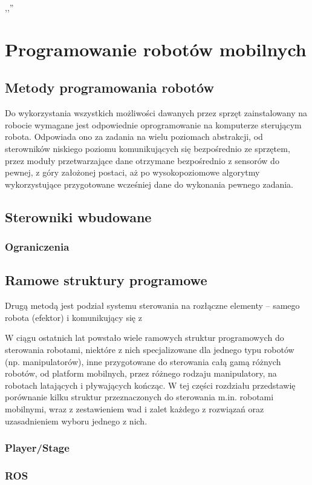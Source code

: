 

\begin{savequote}[70mm]
,,''
\qauthor{}
\end{savequote}


\chapter{Programowanie robotów mobilnych}
\label{chap:programowanie}

\section{Metody programowania robotów}

Do wykorzystania wszystkich możliwości dawanych przez sprzęt zainstalowany na robocie
wymagane jest odpowiednie oprogramowanie na komputerze sterującym robota. Odpowiada
ono za zadania na wielu poziomach abstrakcji, od sterowników niskiego poziomu
komunikujących się bezpośrednio ze sprzętem, przez moduły przetwarzające dane otrzymane
bezpośrednio z sensorów do pewnej, z góry założonej postaci, aż po wysokopoziomowe
algorytmy wykorzystujące przygotowane wcześniej dane do wykonania pewnego zadania.

\section{Sterowniki wbudowane}

\subsection{Ograniczenia}

\section{Ramowe struktury programowe}

Drugą metodą jest podział systemu sterowania na rozłączne elementy -- samego 
robota (efektor) i komunikujący się z

W ciągu ostatnich lat powstało wiele ramowych struktur programowych do sterowania
robotami, niektóre z nich specjalizowane dla jednego typu robotów (np. manipulatorów),
inne przygotowane do sterowania całą gamą różnych robotów, od platform mobilnych,
przez różnego rodzaju manipulatory, na robotach latających i pływających kończąc.
W tej części rozdziału przedstawię porównanie kilku struktur przeznaczonych do
sterowania m.in. robotami mobilnymi, wraz z zestawieniem wad i zalet każdego z rozwiązań
oraz uzasadnieniem wyboru jednego z nich.


\subsection{Player/Stage}

\cite{gerkey03playerstage}

\subsection{ROS}

\cite{288}

